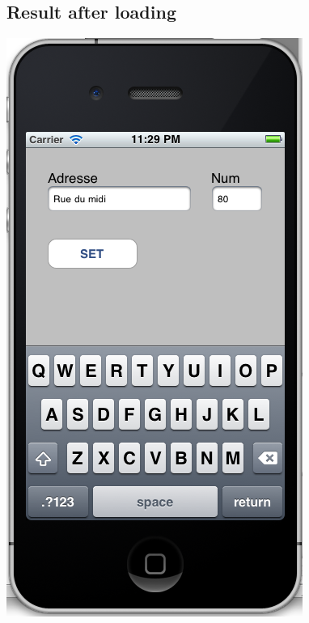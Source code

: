 \documentclass[a4paper,10pt]{article}
\begin{document}
			\subsection{Result after loading}	
					\begin{center}
						\includegraphics[scale=0.3]{./images/resutl1KVO.png}
					\end{center}
\end{document}
